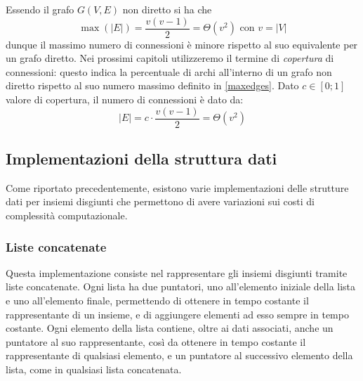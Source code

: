Essendo il grafo $G(V, E)$ non diretto si ha che
\begin{equation} \label{maxedges}
    \max(|E|) = \frac{v(v-1)}{2} = \Theta(v^2) \text{ con } v = |V|
\end{equation}
dunque il massimo numero di connessioni è minore rispetto al suo equivalente
per un grafo diretto. Nei prossimi capitoli utilizzeremo il termine di \textit{copertura}\label{coverage} di connessioni: questo indica la percentuale
di archi all'interno di un grafo non diretto rispetto al suo numero massimo definito in \eqref{maxedges}. Dato $c \in [0;1]$
valore di copertura, il numero di connessioni è dato da:
\begin{equation} \label{coverageEdges}
    |E| = c \cdot \frac{v(v-1)}{2} = \Theta(v^2)
\end{equation}


\subsection{Implementazioni della struttura dati}
Come riportato precedentemente, esistono varie implementazioni delle strutture
dati per insiemi disgiunti che permettono di avere variazioni sui costi di complessità
computazionale.

\subsubsection{Liste concatenate}
Questa implementazione consiste nel rappresentare gli insiemi disgiunti tramite liste
concatenate. Ogni lista ha due puntatori, uno all'elemento iniziale della lista e uno
all'elemento finale, permettendo di ottenere in tempo costante il rappresentante di un
insieme, e di aggiungere elementi ad esso sempre in tempo costante. Ogni elemento della
lista contiene, oltre ai dati associati, anche un puntatore al suo rappresentante, così da
ottenere in tempo costante il rappresentante di qualsiasi elemento, e un puntatore al
successivo elemento della lista, come in qualsiasi lista concatenata.\newline

